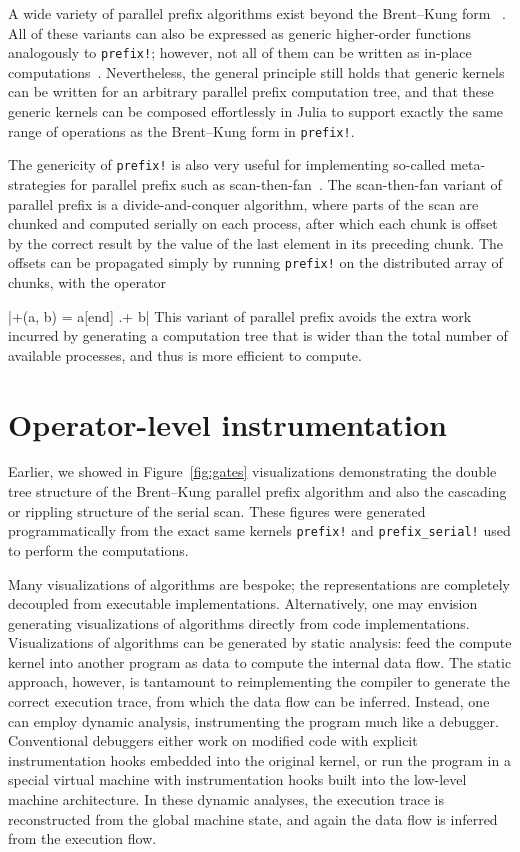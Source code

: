 \documentclass{sig-alternate}
\newcommand{\code}[1]{\texttt{#1}}
\begin{document}
A wide variety of parallel prefix algorithms exist beyond the Brent--Kung form
~\cite{Blelloch1989,Egecioglu1992,Kogge1973,Kruskal1985,Ladner1980,Ofman1962,Ofman1963,Sklansky1960,Sanders2006,Sengupta2007,Wang1996}.
All of these variants can also be expressed as generic higher-order functions
analogously to \code{prefix!}; however, not all of them can be written as
in-place computations~\cite{Merrill2009}. Nevertheless, the general principle
still holds that generic kernels can be written for an arbitrary parallel
prefix computation tree, and that these generic kernels can be composed
effortlessly in Julia to support exactly the same range of operations as the
Brent--Kung form in \code{prefix!}.

The genericity of \code{prefix!} is also very useful for implementing
so-called meta-strategies for parallel prefix such as
scan-then-fan~\cite{Merrill2009,Wilt2013}. The scan-then-fan variant of
parallel prefix is a divide-and-conquer algorithm, where parts of the scan are
chunked and computed serially on each process, after which each chunk is
offset by the correct result by the value of the last element in its preceding
chunk. The offsets can be propagated simply by running \code{prefix!} on the
distributed array of chunks, with the operator

|+(a, b) = a[end] .+ b|
%
This variant of parallel prefix avoids the extra work incurred by generating a
computation tree that is wider than the total number of available processes,
and thus is more efficient to compute.

\section{Operator-level instrumentation}

Earlier, we showed in Figure~\ref{fig:gates} visualizations demonstrating the
double tree structure of the Brent--Kung parallel prefix algorithm and also the
cascading or rippling structure of the serial scan. These figures were
generated programmatically from the exact same kernels \code{prefix!} and
\code{prefix\_serial!} used to perform the computations.

Many visualizations of algorithms are bespoke; the representations are
completely decoupled from executable implementations. Alternatively, one may
envision generating visualizations of algorithms directly from code
implementations. Visualizations of algorithms can be generated by static
analysis: feed the compute kernel into another program as data to compute the
internal data flow. The static approach, however, is tantamount to
reimplementing the compiler to generate the correct execution trace, from which
the data flow can be inferred. Instead, one can employ dynamic analysis,
instrumenting the program much like a debugger. Conventional debuggers either
work on modified code with explicit instrumentation hooks embedded into the
original kernel, or run the program in a special virtual machine with
instrumentation hooks built into the low-level machine architecture. In these
dynamic analyses, the execution trace is reconstructed from the global machine
state, and again the data flow is inferred from the execution flow.
\end{document}
